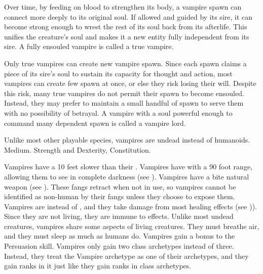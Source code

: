   Over time, by feeding on blood to strengthen its body, a vampire spawn can connect more deeply to its original soul.
  If allowed and guided by its sire, it can become strong enough to wrest the rest of its soul back from its afterlife.
  This unifies the creature's soul and makes it a new entity fully independent from its sire.
  A fully ensouled vampire is called a true vampire.

  Only true vampires can create new vampire spawn.
  Since each spawn claims a piece of its sire's soul to sustain its capacity for thought and action, most vampires can create few spawn at once, or else they risk losing their will.
  Despite this risk, many true vampires do not permit their spawn to become ensouled.
  Instead, they may prefer to maintain a small handful of spawn to serve them with no possibility of betrayal.
  A vampire with a soul powerful enough to command many dependent spawn is called a vampire lord.

   Unlike most other playable species, vampires are undead instead of humanoids.
   Medium.
    Strength and Dexterity,  Constitution.
  \begin{raggeditemize}
     Vampires have a  10 feet slower than their .
     Vampires have  with a 90 foot range, allowing them to see in complete darkness (see ).
     Vampires have a bite natural weapon (see ).
      These fangs retract when not in use, so vampires cannot be identified as non-human by their fangs unless they choose to expose them.
     Vampires are  instead of , and they take damage from most healing effects (see )).
      Since they are not living, they are immune to \atPoison effects.
     Unlike most undead creatures, vampires share some aspects of living creatures.
      They must breathe air, and they must sleep as much as humans do.
     Vampires gain a  bonus to the Persuasion skill.
     Vampires only gain two class archetypes instead of three.
      Instead, they treat the Vampire archetype as one of their archetypes, and they gain ranks in it just like they gain ranks in class archetypes.
  \end{raggeditemize}

